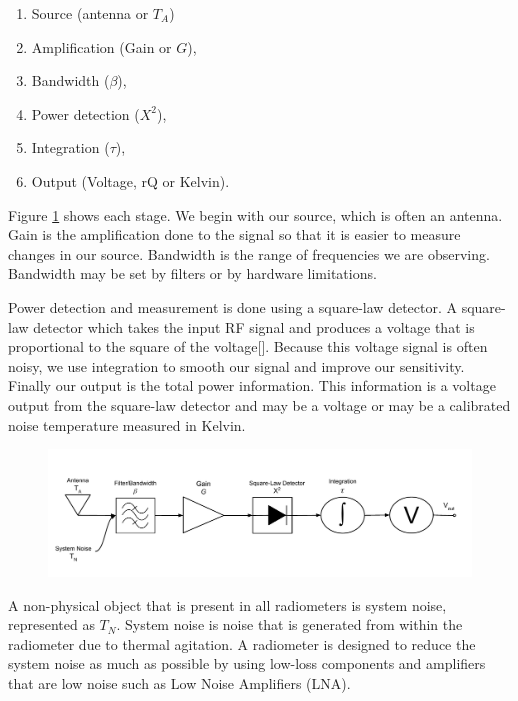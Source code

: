 \begin{enumerate}
\item Source (antenna or $T_{A}$)
\item Amplification (Gain or $G$),
\item Bandwidth ($\beta$),
\item Power detection ($X^{2}$),
\item Integration ($\tau$),
\item Output (Voltage, rQ or Kelvin).
\end{enumerate}

Figure \ref{trad_radiometer} shows each stage.  We begin with our source, which is often an antenna.  Gain is the amplification done to the signal so that it is easier to measure changes in our source.  Bandwidth is the range of frequencies we are observing.  Bandwidth may be set by filters or by hardware limitations. 

Power detection and measurement is done using a square-law detector.  A square-law detector which takes the input RF signal and produces a voltage that is proportional to the square of the voltage[\cite{Leinweber}].  Because this voltage signal is often noisy, we use integration to smooth our signal and improve our sensitivity.  Finally our output is the total power information.  This information is a voltage output from the square-law detector and may be a voltage or may be a calibrated noise temperature measured in Kelvin.

{\begin{figure}[h!tb] 
\centering
\includegraphics[width=\textwidth]{Images/Traditional_Radiometer.pdf}
\label{trad_radiometer}
\end{figure}
}

A non-physical object that is present in all radiometers is system noise, represented as $T_{N}$.  System noise is noise that is generated from within the radiometer due to thermal agitation.  A radiometer is designed to reduce the system noise as much as possible by using low-loss components and amplifiers that are low noise such as Low Noise Amplifiers (LNA). 

